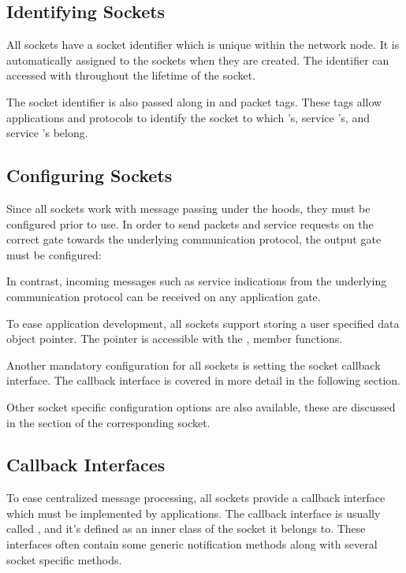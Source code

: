\subsection*{Identifying Sockets}

All sockets have a socket identifier which is unique within the network node. It
is automatically assigned to the sockets when they are created. The identifier
can accessed with  throughout the lifetime of the socket.

The socket identifier is also passed along in  and
 packet tags. These tags allow applications and protocols to
identify the socket to which 's, service 's,
and service 's belong.

\subsection*{Configuring Sockets}

Since all sockets work with message passing under the hoods, they must be
configured prior to use. In order to send packets and service requests on the
correct gate towards the underlying communication protocol, the output gate must
be configured:


In contrast, incoming messages such as service indications from the underlying
communication protocol can be received on any application gate.

To ease application development, all sockets support storing a user specified
data object pointer. The pointer is accessible with the ,
 member functions.

Another mandatory configuration for all sockets is setting the socket callback
interface. The callback interface is covered in more detail in the following
section.

Other socket specific configuration options are also available, these are
discussed in the section of the corresponding socket.

\subsection*{Callback Interfaces}

To ease centralized message processing, all sockets provide a callback interface
which must be implemented by applications. The callback interface is usually
called , and it's defined as an inner class of the socket it
belongs to. These interfaces often contain some generic notification methods
along with several socket specific methods.

